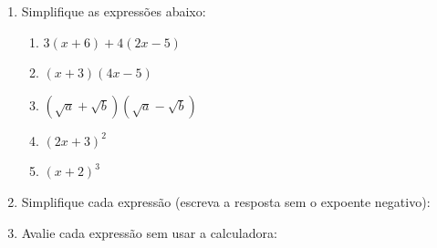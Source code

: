 \documentclass[a4paper,5pt]{amsbook}
\newcommand{\ds}{\displaystyle}
\begin{document}
\vspace{1cm}
\begin{enumerate}
    \vspace{0.5cm}
    \item Simplifique as express\~oes abaixo:
        \begin{enumerate}
            \vspace{0.3cm}
            \item $3(x+6)+4(2x-5)$
            \vspace{0.3cm}
            \item $(x+3)(4x-5)$
            \vspace{0.3cm}
            \item $(\sqrt{a}+\sqrt{b})(\sqrt{a}-\sqrt{b})$
            \vspace{0.3cm}
            \item ${(2x+3)}^2$
            \vspace{0.3cm}
            \item ${(x+2)}^3$
        \end{enumerate}

    \vspace{0.5cm}
    \item Simplifique cada express\~ao (escreva a resposta sem o expoente negativo):

        \noindent{}

    \vspace{0.5cm}
    \item Avalie cada express\~ao sem usar a calculadora:


\end{enumerate}
\end{document}
